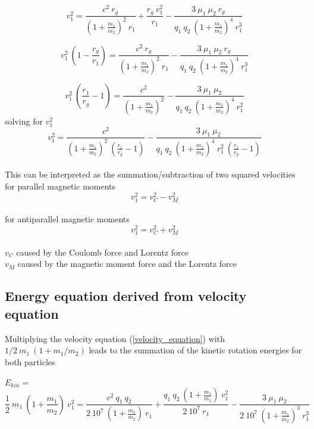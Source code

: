 \documentclass[10pt,titlepage]{article}
\begin{document}
\begin{equation} v_1^2=\frac{c^2 \ r_g}{(1+\frac{m_1}{m_2})^2 \ r_1}+\frac{r_g \ v_1^2}{r_1}-\frac{3 \ \mu_1 \ \mu_2 \ r_g}{q_1 \ q_2 \ (1+\frac{m_1}{m_2})^4 \ r_1^3}
\end{equation}

\begin{equation} v_1^2 \ (1-\frac{r_g}{r_1})=\frac{c^2 \ r_g}{(1+\frac{m_1}{m_2})^2 \ r_1}-\frac{3 \ \mu_1 \ \mu_2 \ r_g}{q_1 \ q_2 \ (1+\frac{m_1}{m_2})^4 \ r_1^3}
\end{equation}

\begin{equation} v_1^2 \ (\frac{r_1}{r_g}-1)=\frac{c^2}{(1+\frac{m_1}{m_2})^2}-\frac{3 \ \mu_1 \ \mu_2}{q_1 \ q_2 \ (1+\frac{m_1}{m_2})^4 \ r_1^2}
\end{equation}
solving for $v_1^2$
\begin{equation} v_1^2=\frac{c^2}{(1+\frac{m_1}{m_2})^2 \ (\frac{r_1}{r_g}-1)}-\frac{3 \ \mu_1 \ \mu_2}{q_1 \ q_2 \ (1+\frac{m_1}{m_2})^4 \ r_1^2 \ (\frac{r_1}{r_g}-1)}
\end{equation}
\\
This can be interpreted as the summation/subtraction of two squared velocities
for parallel magnetic moments
\begin{equation}
v_1^2= v_C^2 - v_M^2 
\end{equation}
\\
for antiparallel magnetic moments
\begin{equation}
v_1^2= v_C^2 + v_M^2 
\end{equation}
\\
$v_C$ caused by the Coulomb force and Lorentz force\\
$v_M$ caused by the magnetic moment force and the Lorentz force



\subsection{Energy equation derived from velocity equation}

Multiplying the velocity equation (\ref{velocity_equation}) with $1/2 \ m_1 \ (1+m_1/m_2)$ leads to the summation of the kinetic rotation energies for both particles\\\\ $E_{kin}=$
\begin{equation} \frac{1}{2} \ m_1 \ (1+\frac{m_1}{m_2}) \ v_1^2=
\frac{c^2 \ q_1 \ q_2}{2 \ 10^7 \ (1+\frac{m_1}{m_2}) \ r_1}
+\frac{q_1 \ q_2 \ (1+\frac{m_1}{m_2}) \ v_1^2}{2 \ 10^7 \ r_1}
-\frac{3 \ \mu_1 \ \mu_2}{2 \ 10^7 \ (1+\frac{m_1}{m_2})^3 \ r_1^3}
\end{equation}
\\
\end{document}
